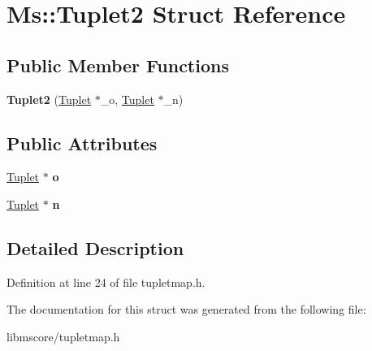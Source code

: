 \hypertarget{struct_ms_1_1_tuplet2}{}\section{Ms\+:\+:Tuplet2 Struct Reference}
\label{struct_ms_1_1_tuplet2}
\subsection*{Public Member Functions}
\begin{DoxyCompactItemize}
\item 
\mbox{\label{struct_ms_1_1_tuplet2_afe59a8859e37c1ae62a36d38b73742bd}} 
{\bfseries Tuplet2} (\hyperlink{class_ms_1_1_tuplet}{Tuplet} $\ast$\+\_\+o, \hyperlink{class_ms_1_1_tuplet}{Tuplet} $\ast$\+\_\+n)
\end{DoxyCompactItemize}
\subsection*{Public Attributes}
\begin{DoxyCompactItemize}
\item 
\mbox{\label{struct_ms_1_1_tuplet2_a747c4ad5f6422aa67093990949e5a861}} 
\hyperlink{class_ms_1_1_tuplet}{Tuplet} $\ast$ {\bfseries o}
\item 
\mbox{\label{struct_ms_1_1_tuplet2_a4628ad69a6ddce12c373da3a2d58cc3c}} 
\hyperlink{class_ms_1_1_tuplet}{Tuplet} $\ast$ {\bfseries n}
\end{DoxyCompactItemize}


\subsection{Detailed Description}


Definition at line 24 of file tupletmap.\+h.



The documentation for this struct was generated from the following file\+:\begin{DoxyCompactItemize}
\item 
libmscore/tupletmap.\+h\end{DoxyCompactItemize}
